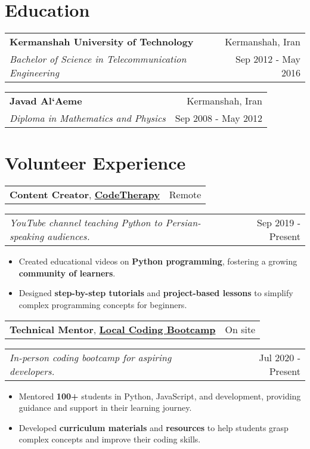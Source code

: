 \documentclass[letterpaper,11pt]{article}
\makeatletter
\newcommand{\resumeItemSimple}[1]{
  \item\small{
    {#1}
  }
}
\newcommand{\resumeSubheading}[4]{
  \vspace{-1pt}
    \begin{tabular*}{1\textwidth}[t]{l@{\extracolsep{\fill}}r}
      \textbf{#1} & #2 \\
      \textit{\small#3} & \small #4 \\
    \end{tabular*}
}
\newcommand{\resumeSubheadingSimple}[5]{
    \begin{tabular*}{1\textwidth}[t]{l@{\extracolsep{\fill}}r}
      \textbf{#1}, \textbf{\href{#3}{#2}} \space \small#4 & \small#5 \\
    \end{tabular*}
}
\newcommand{\resumeSubSubheading}[2]{
    \begin{tabular*}{1\textwidth}{l@{\extracolsep{\fill}}r}
      \textit{\small#1} & \small #2 \\
    \end{tabular*}\vspace{-1pt}
}
\newcommand{\resumeItemListStart}{\begin{itemize}[leftmargin=0.5cm, itemsep=1pt, parsep=0pt]} %
\newcommand{\resumeItemListEnd}{\end{itemize}}
\newcommand{\skillItem}[2]{
  \textbf{#1:} #2 \\ {\vspace{3px}}
}
\makeatother
\begin{document}

\section{Education}
    \resumeSubheading
      {Kermanshah University of Technology}{Kermanshah, Iran}
      {Bachelor of Science in Telecommunication Engineering}{Sep 2012 - May 2016}
    \resumeSubheading
      {Javad Al`Aeme}{Kermanshah, Iran}
      {Diploma in Mathematics and Physics}{Sep 2008 - May 2012}

\section{Volunteer Experience}

  \resumeSubheadingSimple
  {Content Creator}{CodeTherapy}{https://www.youtube.com/@CodeTherapy}{}{Remote}
    \resumeSubSubheading{YouTube channel teaching Python to Persian-speaking audiences.}{Sep 2019 - Present}
    \resumeItemListStart
      \resumeItemSimple{Created educational videos on \textbf{Python programming}, fostering a growing \textbf{community of learners}.}
      \resumeItemSimple{Designed \textbf{step-by-step tutorials} and \textbf{project-based lessons} to simplify complex programming concepts for beginners.}
    \resumeItemListEnd

  \resumeSubheadingSimple
  {Technical Mentor}{Local Coding Bootcamp}{}{}{On site}
    \resumeSubSubheading{In-person coding bootcamp for aspiring developers.}{Jul 2020 - Present}
    \resumeItemListStart
      \resumeItemSimple{Mentored \textbf{100+} students in Python, JavaScript, and development, providing guidance and support in their learning journey.}
      \resumeItemSimple{Developed \textbf{curriculum materials} and \textbf{resources} to help students grasp complex concepts and improve their coding skills.}
    \resumeItemListEnd
\end{document}
